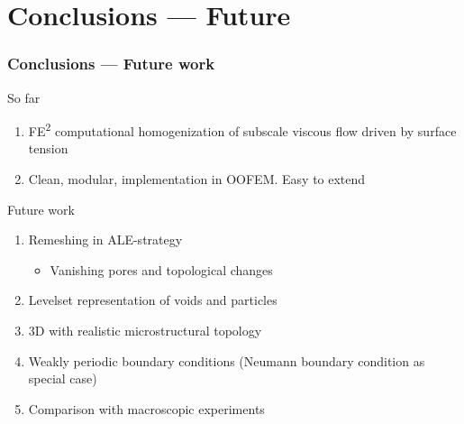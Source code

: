 \documentclass[11pt,mathserif]{beamer}
\begin{document}
\section{Conclusions --- Future}
\begin{frame}
 \frametitle{Conclusions --- Future work}
 So far
 \begin{enumerate}
  \item FE\textsuperscript{2} computational homogenization of subscale viscous flow driven by surface tension
  \item Clean, modular, implementation in OOFEM. Easy to extend
 \end{enumerate}

 Future work
 \begin{enumerate}
  \item Remeshing in ALE-strategy
  \begin{itemize}
   \item Vanishing pores and topological changes
  \end{itemize}
  \item Levelset representation of voids and particles
  \item 3D with realistic microstructural topology
  \item Weakly periodic boundary conditions (Neumann boundary condition as special case)
  \item Comparison with macroscopic experiments
 \end{enumerate}

\end{frame}

\end{document}
